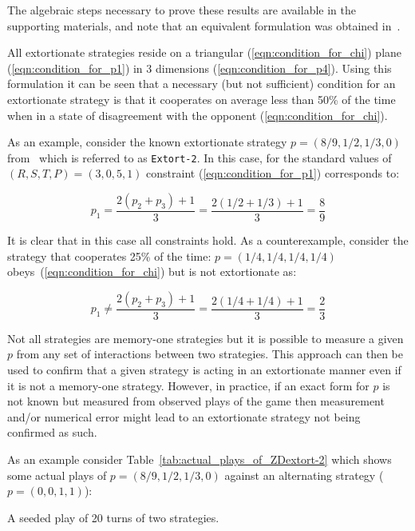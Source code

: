 \documentclass[a4paper]{article}
\begin{document}
The algebraic steps necessary to prove these results are available in the
supporting materials, and note that an equivalent formulation was obtained
in~\cite{adami2013evolutionary}.

All extortionate strategies reside on a triangular (\ref{eqn:condition_for_chi})
plane (\ref{eqn:condition_for_p1}) in 3 dimensions (\ref{eqn:condition_for_p4}).
Using this formulation it can be seen that a necessary (but not sufficient)
condition for an extortionate strategy is that it cooperates on average less
than 50\% of the time when in a state of disagreement with the opponent
(\ref{eqn:condition_for_chi}).

As an example, consider the known extortionate strategy \(p=(8 / 9, 1 / 2, 1 /
3, 0)\) from~\cite{Stewart2012} which is referred to as \texttt{Extort-2}. In
this case, for the standard values of \((R, S, T, P) = (3, 0, 5, 1)\)
constraint (\ref{eqn:condition_for_p1}) corresponds to:

\begin{equation}
    p_1 = \frac{2(p_2 + p_3) + 1}{3}
        = \frac{2(1 / 2 + 1 / 3) + 1}{3}
        = \frac{8}{9}
\end{equation}

It is clear that in this case all constraints hold. As a counterexample,
consider the strategy that cooperates 25\% of the time: \(p=(1 /4, 1 / 4, 1 / 4,
1 / 4)\) obeys~(\ref{eqn:condition_for_chi}) but is not extortionate as:

\begin{equation}
    p_1 \ne \frac{2(p_2 + p_3) + 1}{3}
        = \frac{2(1 / 4 + 1 / 4) + 1}{3}
        = \frac{2}{3}
\end{equation}

Not all strategies are memory-one strategies but it is possible to
measure a given \(p\) from any set of interactions between two strategies.
This approach can then be used to confirm that a given strategy is acting
in an extortionate manner even if it is not a memory-one strategy. However, in
practice, if an exact form for \(p\) is not known but measured from observed
plays of the game then measurement and/or numerical error might lead to an
extortionate strategy not being confirmed as such.

As an example consider Table~\ref{tab:actual_plays_of_ZDextort-2} which shows
some actual plays of \(p=(8 / 9, 1 / 2, 1 / 3, 0)\) against an alternating
strategy (\(p=(0, 0, 1, 1)\)):

\begin{table}[!hbtp]
    
    \caption{A seeded play of 20 turns of two strategies.}
    \label{tab:actual_plays_of_ZDextort-2}
\end{table}
\end{document}
